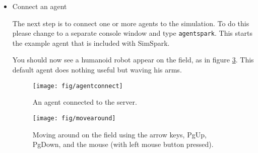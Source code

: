 \begin{itemize}
After the monitor started you are able to use the mouse and keyboard
to navigate the scene. Please refer to chapter
\ref{cha:monitorspark} for a complete list of the available key bindings. 

You can use the numbers of the keypad to navigate to different
positions on the playing field. The view after pressing \texttt{3} is
given in figure \ref{fig:press3}. The movement of the camera is
controlled with the arrow keys, PgUp and PgDown. Press the left mouse
button and move the mouse to change the camera view.


\begin{figure}[htbp]
\begin{center}
\texttt{[image: fig/startup]}
\caption{View of the soccer simulation after the simulator has just been started.}
\label{fig:startup}
\end{center}
\end{figure}

\begin{figure}[htbp]
\begin{center}
\texttt{[image: fig/press3]}
\caption{Change the view by pressing '3' on the keyboard.}
\label{fig:press3}
\end{center}
\end{figure}


\item{Connect an agent}

The next step is to connect one or more agents to the simulation. To
do this please change to a separate console window and type \texttt{agentspark}.
This starts the example agent that is included with SimSpark. 

You should now see a humanoid robot appear on the field, as in figure
\ref{fig:agentconnect}. This default agent does nothing useful but waving his arms.

\begin{figure}[htbp]
\begin{center}
\texttt{[image: fig/agentconnect]}
\caption{An agent connected to the server.}
\label{fig:agentconnect}
\end{center}
\end{figure}

\begin{figure}[htbp]
\begin{center}
\texttt{[image: fig/movearound]}
\caption{Moving around on the field using the arrow keys, PgUp, PgDown, and the mouse (with left mouse button pressed).}
\label{fig:movearound}
\end{center}
\end{figure}



\end{itemize}
